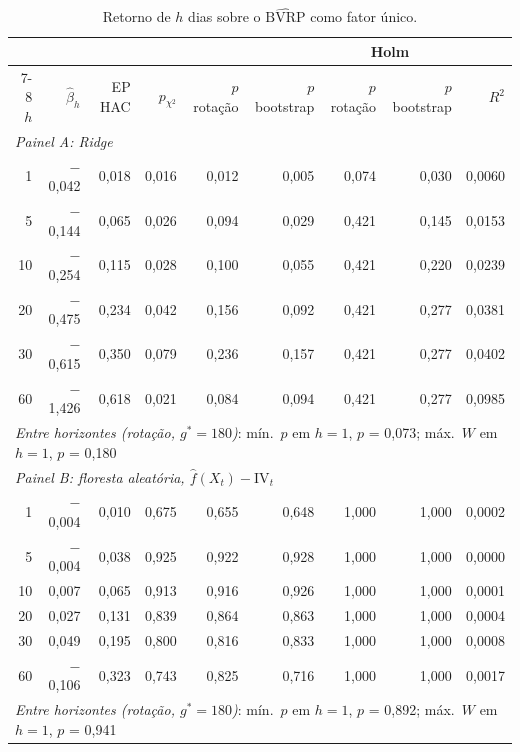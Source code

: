 \begin{table}[H]
\centering
\footnotesize
\caption{Retorno de $h$ dias sobre o $\widehat{\text{BVRP}}$ como fator único.}
\label{tab:retlin-um-fator}
\begin{tabular}{rrrrrrrrr}
\toprule
 & & & & & & \multicolumn{2}{c}{Holm} & \\ \cmidrule(lr){7-8}
$h$ & $\hat\beta_h$ & EP HAC & $p_{\chi^2}$ & $p$ rotação & $p$ bootstrap & $p$ rotação & $p$ bootstrap & $R^2$ \\
\midrule
\multicolumn{9}{l}{\textit{Painel A: Ridge}} \\
1 & $-$0{,}042 & 0{,}018 & 0{,}016 & 0{,}012 & 0{,}005 & 0{,}074 & 0{,}030 & 0{,}0060 \\
5 & $-$0{,}144 & 0{,}065 & 0{,}026 & 0{,}094 & 0{,}029 & 0{,}421 & 0{,}145 & 0{,}0153 \\
10 & $-$0{,}254 & 0{,}115 & 0{,}028 & 0{,}100 & 0{,}055 & 0{,}421 & 0{,}220 & 0{,}0239 \\
20 & $-$0{,}475 & 0{,}234 & 0{,}042 & 0{,}156 & 0{,}092 & 0{,}421 & 0{,}277 & 0{,}0381 \\
30 & $-$0{,}615 & 0{,}350 & 0{,}079 & 0{,}236 & 0{,}157 & 0{,}421 & 0{,}277 & 0{,}0402 \\
60 & $-$1{,}426 & 0{,}618 & 0{,}021 & 0{,}084 & 0{,}094 & 0{,}421 & 0{,}277 & 0{,}0985 \\
\multicolumn{9}{l}{\textit{Entre horizontes (rotação, $g^* = 180$)}: mín.\ $p$ em $h = 1$, $p$ = 0{,}073; máx.\ $W$ em $h = 1$, $p$ = 0{,}180} \\
\midrule
\multicolumn{9}{l}{\textit{Painel B: floresta aleatória, $\hat f(X_t)-\text{IV}_t$}} \\
1 & $-$0{,}004 & 0{,}010 & 0{,}675 & 0{,}655 & 0{,}648 & 1{,}000 & 1{,}000 & 0{,}0002 \\
5 & $-$0{,}004 & 0{,}038 & 0{,}925 & 0{,}922 & 0{,}928 & 1{,}000 & 1{,}000 & 0{,}0000 \\
10 & 0{,}007 & 0{,}065 & 0{,}913 & 0{,}916 & 0{,}926 & 1{,}000 & 1{,}000 & 0{,}0001 \\
20 & 0{,}027 & 0{,}131 & 0{,}839 & 0{,}864 & 0{,}863 & 1{,}000 & 1{,}000 & 0{,}0004 \\
30 & 0{,}049 & 0{,}195 & 0{,}800 & 0{,}816 & 0{,}833 & 1{,}000 & 1{,}000 & 0{,}0008 \\
60 & $-$0{,}106 & 0{,}323 & 0{,}743 & 0{,}825 & 0{,}716 & 1{,}000 & 1{,}000 & 0{,}0017 \\
\multicolumn{9}{l}{\textit{Entre horizontes (rotação, $g^* = 180$)}: mín.\ $p$ em $h = 1$, $p$ = 0{,}892; máx.\ $W$ em $h = 1$, $p$ = 0{,}941} \\

\end{tabular}
\end{table}
